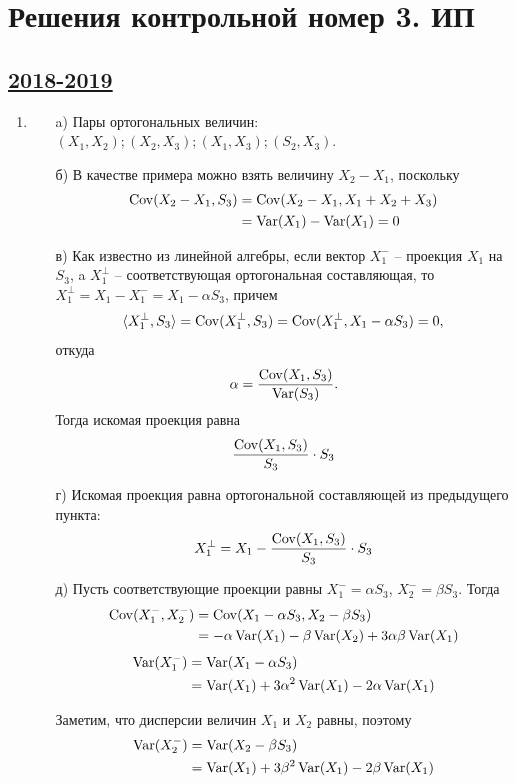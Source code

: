 \thispagestyle{empty}
\section{Решения контрольной номер 3. ИП}




\subsection[2018-2019]{\hyperref[sec:kr_03_ip_2018_2019]{2018-2019}}
\label{sec:sol_kr_03_ip_2018_2019}

\begin{enumerate}
\item
\begin{enumerate}
\item[a)] Пары ортогональных величин: $(X_1,X_2);(X_2,X_3);(X_1,X_3);(S_2,X_3)$.
\item[б)] В качестве примера можно взять величину $X_2-X_1$, поскольку 
\begin{align*}
\operatorname{Cov}(X_2-X_1,S_3)&=\operatorname{Cov}(X_2-X_1,X_1+X_2+X_3)\\
&=\operatorname{Var}(X_1)-\operatorname{Var}(X_1)=0
\end{align*}
\item[в)] Как известно из линейной алгебры, если вектор $X^-_1$ – проекция $X_1$ на $S_3$, a $X^{\perp}_1$ – соответствующая ортогональная составляющая, то $X^{\perp}_1=X_1-X^-_1=X_1-\alpha S_3$, причем 
\[
\langle X^{\perp}_1,S_3\rangle=\operatorname{Cov}(X^{\perp}_1,S_3)=\operatorname{Cov}(X^{\perp}_1,X_1-\alpha S_3)=0,
\] 
откуда 
\[
\alpha=\frac{\operatorname{Cov}(X_1,S_3)}{\operatorname{Var}(S_3)}.
\]
Тогда искомая проекция равна 
\[
\frac{\operatorname{Cov}(X_1,S_3)}{S_3}\cdot S_3
\]
\item[г)] Искомая проекция равна ортогональной составляющей из предыдущего пункта:
\[
X^{\perp}_1=X_1-\frac{\operatorname{Cov}(X_1,S_3)}{S_3}\cdot S_3
\]
\item[д)] Пусть соответствующие проекции равны $X^-_1=\alpha S_3$, $X^-_2=\beta S_3$. Тогда 
\begin{align*}
\operatorname{Cov}(X^-_1,X^-_2)&=\operatorname{Cov}(X_1-\alpha S_3,X_2 - \beta S_3)\\
&=-\alpha\operatorname{Var}(X_1)-\beta\operatorname{Var}(X_2)+3\alpha\beta\operatorname{Var}(X_1)
\end{align*}
\begin{align*}
\operatorname{Var}(X^-_1)&=\operatorname{Var}(X_1-\alpha S_3)\\
&=\operatorname{Var}(X_1)+3\alpha^2\operatorname{Var}(X_1)-2\alpha\operatorname{Var}(X_1)
\end{align*}

Заметим, что дисперсии величин $X_1$ и $X_2$ равны, поэтому
\begin{align*}
\operatorname{Var}(X^-_2)&=\operatorname{Var}(X_2-\beta S_3)\\
&=\operatorname{Var}(X_1)+3\beta^2\operatorname{Var}(X_1)-2\beta\operatorname{Var}(X_1)
\end{align*}


\end{enumerate}
\end{enumerate}
